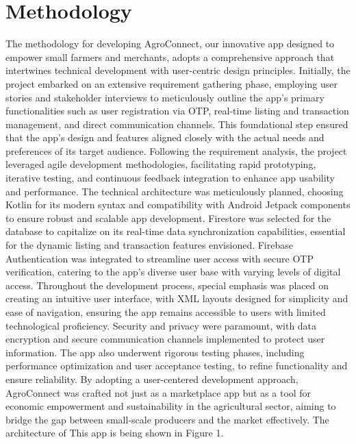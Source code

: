 \documentclass{article}
\begin{document}
\section{Methodology}
The methodology for developing AgroConnect, our innovative app designed to empower small farmers and merchants, adopts a comprehensive approach that intertwines technical development with user-centric design principles. Initially, the project embarked on an extensive requirement gathering phase, employing user stories and stakeholder interviews to meticulously outline the app's primary functionalities such as user registration via OTP, real-time listing and transaction management, and direct communication channels. This foundational step ensured that the app's design and features aligned closely with the actual needs and preferences of its target audience. Following the requirement analysis, the project leveraged agile development methodologies, facilitating rapid prototyping, iterative testing, and continuous feedback integration to enhance app usability and performance. The technical architecture was meticulously planned, choosing Kotlin for its modern syntax and compatibility with Android Jetpack components to ensure robust and scalable app development. Firestore was selected for the database to capitalize on its real-time data synchronization capabilities, essential for the dynamic listing and transaction features envisioned. Firebase Authentication was integrated to streamline user access with secure OTP verification, catering to the app's diverse user base with varying levels of digital access. Throughout the development process, special emphasis was placed on creating an intuitive user interface, with XML layouts designed for simplicity and ease of navigation, ensuring the app remains accessible to users with limited technological proficiency. Security and privacy were paramount, with data encryption and secure communication channels implemented to protect user information. The app also underwent rigorous testing phases, including performance optimization and user acceptance testing, to refine functionality and ensure reliability. By adopting a user-centered development approach, AgroConnect was crafted not just as a marketplace app but as a tool for economic empowerment and sustainability in the agricultural sector, aiming to bridge the gap between small-scale producers and the market effectively. The architecture of This app is being shown in Figure 1.
\end{document}
